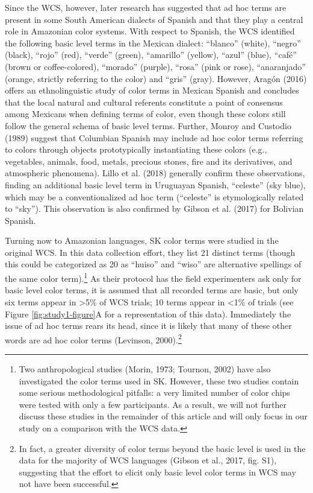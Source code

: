 \documentclass[
  ,apa7,floatsintext]{apa6}
\begin{document}
Since the WCS, however, later research has suggested that ad hoc terms are present in some South American dialects of Spanish and that they play a central role in Amazonian color systems. With respect to Spanish, the WCS identified the following basic level terms in the Mexican dialect: ``blanco'' (white), ``negro'' (black), ``rojo'' (red), ``verde'' (green), ``amarillo'' (yellow), ``azul'' (blue), ``café'' (brown or coffee-colored), ``morado'' (purple), ``rosa'' (pink or rose), ``anaranjado'' (orange, strictly referring to the color) and ``gris'' (gray). However, Aragón (2016) offers an ethnolinguistic study of color terms in Mexican Spanish and concludes that the local natural and cultural referents constitute a point of consensus among Mexicans when defining terms of color, even though these colors still follow the general schema of basic level terms. Further, Monroy and Custodio (1989) suggest that Columbian Spanish may include ad hoc color terms referring to colors through objects prototypically instantiating these colors (e.g., vegetables, animals, food, metals, precious stones, fire and its derivatives, and atmospheric phenomena). Lillo et al. (2018) generally confirm these observations, finding an additional basic level term in Uruguayan Spanish, ``celeste'' (sky blue), which may be a conventionalized ad hoc term (``celeste'' is etymologically related to ``sky''). This observation is also confirmed by Gibson et al. (2017) for Bolivian Spanish.

Turning now to Amazonian languages, SK color terms were studied in the original WCS. In this data collection effort, they list 21 distinct terms (though this could be categorized as 20 as ``huiso'' and ``wiso'' are alternative spellings of the same color term).\footnote{ Two anthropological studies (Morin, 1973; Tournon, 2002) have also investigated the color terms used in SK. However, these two studies contain some serious methodological pitfalls: a very limited number of color chips were tested with only a few participants. As a result, we will not further discuss these studies in the remainder of this article and will only focus in our study on a comparison with the WCS data.} As their protocol has the field experimenters ask only for basic level color terms, it is assumed that all recorded terms are basic, but only six terms appear in \textgreater5\% of WCS trials; 10 terms appear in \textless1\% of trials (see Figure \ref{fig:study1-figure}A for a representation of this data). Immediately the issue of ad hoc terms rears its head, since it is likely that many of these other words are ad hoc color terms (Levinson, 2000).\footnote{In fact, a greater diversity of color terms beyond the basic level is used in the data for the majority of WCS languages (Gibson et al., 2017, fig. S1), suggesting that the effort to elicit only basic level color terms in WCS may not have been successful.}
\end{document}
